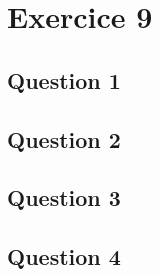 \section{Exercice 9}
\subsection{Question 1}
\subsection{Question 2}
\subsection{Question 3}
\subsection{Question 4}
